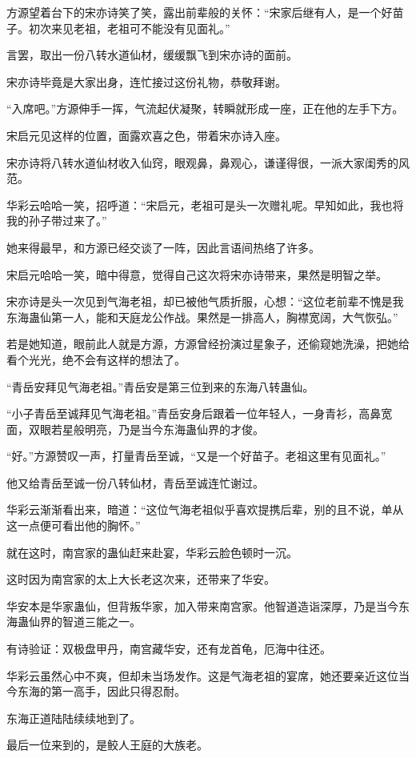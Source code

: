 \begin{this_body}
方源望着台下的宋亦诗笑了笑，露出前辈般的关怀：“宋家后继有人，是一个好苗子。初次来见老祖，老祖可不能没有见面礼。”

言罢，取出一份八转水道仙材，缓缓飘飞到宋亦诗的面前。

宋亦诗毕竟是大家出身，连忙接过这份礼物，恭敬拜谢。

“入席吧。”方源伸手一挥，气流起伏凝聚，转瞬就形成一座，正在他的左手下方。

宋启元见这样的位置，面露欢喜之色，带着宋亦诗入座。

宋亦诗将八转水道仙材收入仙窍，眼观鼻，鼻观心，谦谨得很，一派大家闺秀的风范。

华彩云哈哈一笑，招呼道：“宋启元，老祖可是头一次赠礼呢。早知如此，我也将我的孙子带过来了。”

她来得最早，和方源已经交谈了一阵，因此言语间热络了许多。

宋启元哈哈一笑，暗中得意，觉得自己这次将宋亦诗带来，果然是明智之举。

宋亦诗是头一次见到气海老祖，却已被他气质折服，心想：“这位老前辈不愧是我东海蛊仙第一人，能和天庭龙公作战。果然是一排高人，胸襟宽阔，大气恢弘。”

若是她知道，眼前此人就是方源，方源曾经扮演过星象子，还偷窥她洗澡，把她给看个光光，绝不会有这样的想法了。

“青岳安拜见气海老祖。”青岳安是第三位到来的东海八转蛊仙。

“小子青岳至诚拜见气海老祖。”青岳安身后跟着一位年轻人，一身青衫，高鼻宽面，双眼若星般明亮，乃是当今东海蛊仙界的才俊。

“好。”方源赞叹一声，打量青岳至诚，“又是一个好苗子。老祖这里有见面礼。”

他又给青岳至诚一份八转仙材，青岳至诚连忙谢过。

华彩云渐渐看出来，暗道：“这位气海老祖似乎喜欢提携后辈，别的且不说，单从这一点便可看出他的胸怀。”

就在这时，南宫家的蛊仙赶来赴宴，华彩云脸色顿时一沉。

这时因为南宫家的太上大长老这次来，还带来了华安。

华安本是华家蛊仙，但背叛华家，加入带来南宫家。他智道造诣深厚，乃是当今东海蛊仙界的智道三能之一。

有诗验证：双极盘甲丹，南宫藏华安，还有龙首龟，厄海中往还。

华彩云虽然心中不爽，但却未当场发作。这是气海老祖的宴席，她还要亲近这位当今东海的第一高手，因此只得忍耐。

东海正道陆陆续续地到了。

最后一位来到的，是鲛人王庭的大族老。


\end{this_body}
